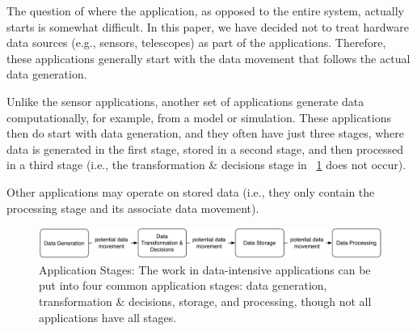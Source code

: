 The question of where the application, as opposed to the entire
system, %
actually starts
is somewhat difficult.  In this paper, we have decided not to treat
hardware data sources (e.g., sensors, telescopes) as part of the
applications.  Therefore, these applications generally start with the
data movement that follows the actual data generation.

Unlike the sensor applications, another set of applications generate
data computationally, for example, from a model or simulation.  These
applications then do start with data generation, and they often have
just three stages, where data is generated in the first stage, stored
in a second stage, and then processed in a third stage (i.e., the
transformation \& decisions stage in
\figurename~\ref{fig:figures_application-stages} does not occur).

Other
applications may operate on stored data (i.e., they only contain the
processing stage and its associate data movement).

\begin{figure}[htbp]
    \centering
        \includegraphics[width=1.0\textwidth]{figures/application-stages-new.pdf}
        \caption{Application Stages: The work in data-intensive
        applications can be put into four common application stages:
		data generation, transformation \& decisions, storage, and processing, though not all
		applications have all stages.
                \label{fig:figures_application-stages}}
\end{figure}



